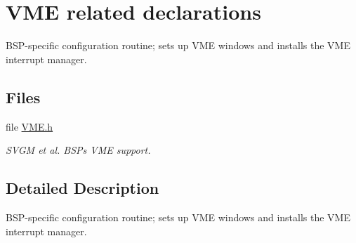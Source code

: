 \hypertarget{group__shared__vme}{}\section{V\+ME related declarations}
\label{group__shared__vme}


B\+S\+P-\/specific configuration routine; sets up V\+ME windows and installs the V\+ME interrupt manager.  


\subsection*{Files}
\begin{DoxyCompactItemize}
\item 
file \mbox{\hyperlink{VME_8h}{V\+M\+E.\+h}}
\begin{DoxyCompactList}\small\item\em S\+V\+GM et al. B\+SP\textquotesingle{}s V\+ME support. \end{DoxyCompactList}\end{DoxyCompactItemize}


\subsection{Detailed Description}
B\+S\+P-\/specific configuration routine; sets up V\+ME windows and installs the V\+ME interrupt manager. 

